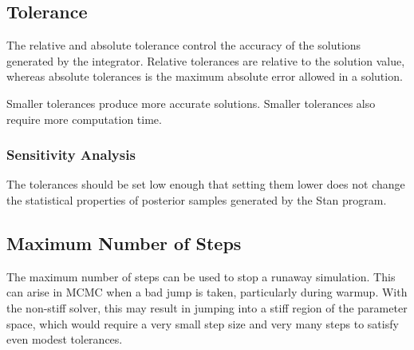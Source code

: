 \subsection{Tolerance}

The relative and absolute tolerance control the accuracy of the
solutions generated by the integrator.  Relative tolerances are
relative to the solution value, whereas absolute tolerances is the
maximum absolute error allowed in a solution.  

Smaller tolerances produce more accurate solutions.  Smaller
tolerances also require more computation time.  

\subsubsection{Sensitivity Analysis}

The tolerances should be set low enough that setting them lower does
not change the statistical properties of posterior samples generated
by the Stan program.

\subsection{Maximum Number of Steps}

The maximum number of steps can be used to stop a runaway simulation.
This can arise in MCMC when a bad jump is taken, particularly during
warmup.  With the non-stiff solver, this may result in jumping into a
stiff region of the parameter space, which would require a very small
step size and very many steps to satisfy even modest tolerances.  
